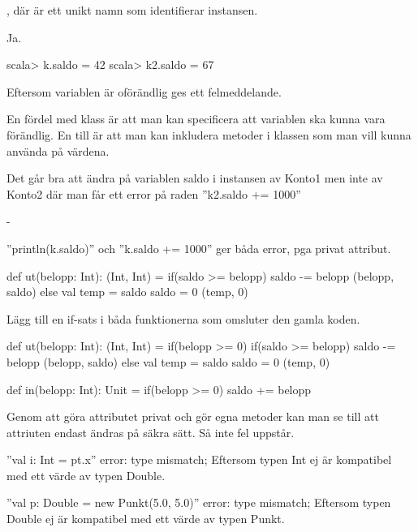\Task %

\Subtask  {}, där  är ett unikt namn som identifierar instansen.

\Subtask  Ja.

\Subtask
\begin{REPLnonum}
scala> k.saldo = 42
scala> k2.saldo = 67
\end{REPLnonum}

\Subtask  Eftersom variablen är oförändlig ges ett felmeddelande.

\Subtask  En fördel med klass är att man kan specificera att variablen ska kunna vara förändlig. En till är att man kan inkludera metoder i klassen som man vill kunna använda på värdena.

\Task %

\Subtask
Det går bra att ändra på variablen saldo i instansen av Konto1 men inte av Konto2 där man får ett error på raden ''k2.saldo += 1000''

\Subtask -

\Subtask
''println(k.saldo)'' och ''k.saldo += 1000'' ger båda error, pga privat attribut.

\Subtask
\begin{Code}
def ut(belopp: Int): (Int, Int) = {
	if(saldo >= belopp) {
		saldo -= belopp
		(belopp, saldo)
	} else {
		val temp = saldo
		saldo = 0
		(temp, 0)
	}
}
\end{Code}

\Subtask
Lägg till en if-sats i båda funktionerna som omsluter den gamla koden.
\begin{Code}
def ut(belopp: Int): (Int, Int) = {
  if(belopp >= 0) {
    if(saldo >= belopp) {
      saldo -= belopp
      (belopp, saldo)
    } else {
      val temp = saldo
      saldo = 0
      (temp, 0)
    }
  }
}

def in(belopp: Int): Unit = {
  if(belopp >= 0) {
    saldo += belopp
  }
}
\end{Code}

\Subtask
Genom att göra attributet privat och gör egna metoder kan man se till att attriuten endast ändras på säkra sätt. Så inte fel uppstår.

\Task %

\Subtask
''val i: Int = pt.x'' error: type mismatch;
Eftersom typen Int ej är kompatibel med ett värde av typen Double.

''val p: Double = new Punkt(5.0, 5.0)'' error: type mismatch;
Eftersom typen Double ej är kompatibel med ett värde av typen Punkt.

